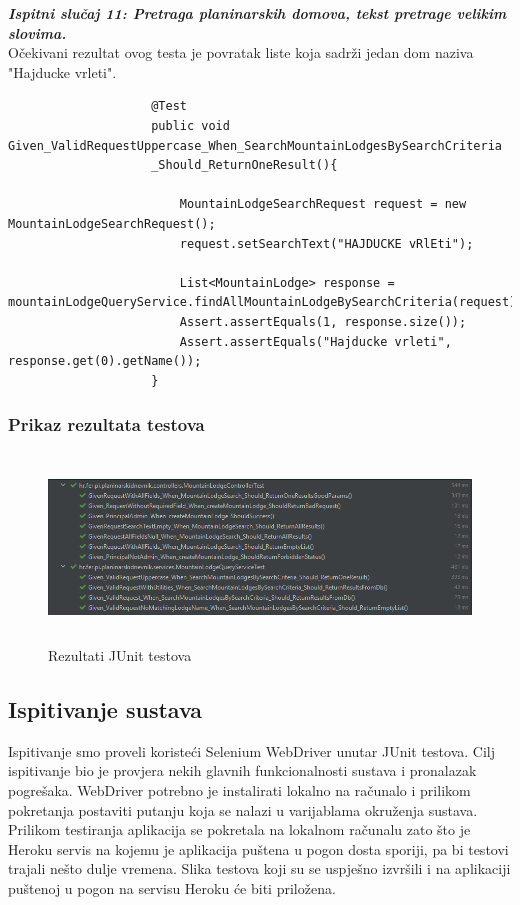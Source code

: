 					\textbf{\textit{Ispitni slučaj 11: Pretraga planinarskih domova, tekst pretrage velikim slovima.}}\\
					Očekivani rezultat ovog testa je povratak liste koja sadrži jedan dom naziva "Hajducke vrleti".\\
							
				
				\begin{lstlisting}
					@Test
					public void Given_ValidRequestUppercase_When_SearchMountainLodgesBySearchCriteria
					_Should_ReturnOneResult(){
						
						MountainLodgeSearchRequest request = new MountainLodgeSearchRequest();
						request.setSearchText("HAJDUCKE vRlEti");
						
						List<MountainLodge> response = mountainLodgeQueryService.findAllMountainLodgeBySearchCriteria(request);
						Assert.assertEquals(1, response.size());
						Assert.assertEquals("Hajducke vrleti", response.get(0).getName());
					}
				\end{lstlisting}
				
				\subsubsection{Prikaz rezultata testova}
				
				\begin{figure}[H]
					\includegraphics[scale=0.6, height=50mm, width=150mm]{slike/junit.png} %
					\centering
					\caption{Rezultati JUnit testova}
					\label{fig:junit testovi}
				\end{figure}
				
				\eject 
			
			
			\subsection{Ispitivanje sustava}
			
			  Ispitivanje smo proveli koristeći Selenium WebDriver unutar JUnit testova. Cilj ispitivanje bio je provjera nekih glavnih funkcionalnosti sustava i pronalazak pogrešaka. WebDriver potrebno je instalirati lokalno na računalo i prilikom pokretanja postaviti putanju koja se nalazi u varijablama okruženja sustava. Prilikom testiranja aplikacija se pokretala na lokalnom računalu zato što je Heroku servis na kojemu je aplikacija puštena u pogon dosta sporiji, pa bi testovi trajali nešto dulje vremena.
			  Slika testova koji su se uspješno izvršili i na aplikaciji puštenoj u pogon na servisu Heroku će biti priložena.\\
	
